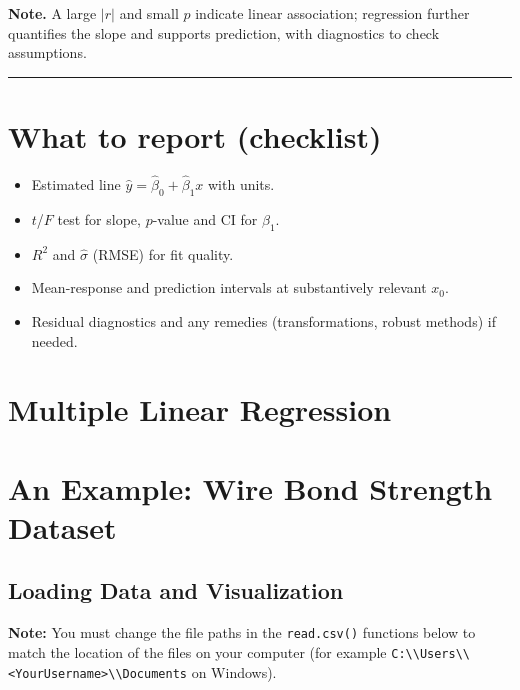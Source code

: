 \documentclass[
  letterpaper,
  DIV=11,
  numbers=noendperiod]{scrreprt}
\providecommand{\tightlist}{%
  \setlength{\itemsep}{0pt}\setlength{\parskip}{0pt}}\usepackage{longtable,booktabs,array}
\begin{document}
\textbf{Note.} A large \(|r|\) and small \(p\) indicate linear
association; regression further quantifies the slope and supports
prediction, with diagnostics to check assumptions.

\begin{center}\rule{0.5\linewidth}{0.5pt}\end{center}

\section{What to report (checklist)}\label{what-to-report-checklist}

\begin{itemize}
\tightlist
\item
  Estimated line \(\hat y=\hat\beta_0+\hat\beta_1 x\) with units.
\item
  \(t\)/\(F\) test for slope, \(p\)-value and CI for \(\beta_1\).
\item
  \(R^2\) and \(\hat\sigma\) (RMSE) for fit quality.
\item
  Mean-response and prediction intervals at substantively relevant
  \(x_0\).
\item
  Residual diagnostics and any remedies (transformations, robust
  methods) if needed.
\end{itemize}

\section{Multiple Linear Regression}\label{multiple-linear-regression}

\section{An Example: Wire Bond Strength
Dataset}\label{an-example-wire-bond-strength-dataset}

\subsection{Loading Data and
Visualization}\label{loading-data-and-visualization}

\textbf{Note:} You must change the file paths in the \texttt{read.csv()}
functions below to match the location of the files on your computer (for
example
\texttt{C:\textbackslash{}\textbackslash{}Users\textbackslash{}\textbackslash{}\textless{}YourUsername\textgreater{}\textbackslash{}\textbackslash{}Documents}
on Windows).
\end{document}
